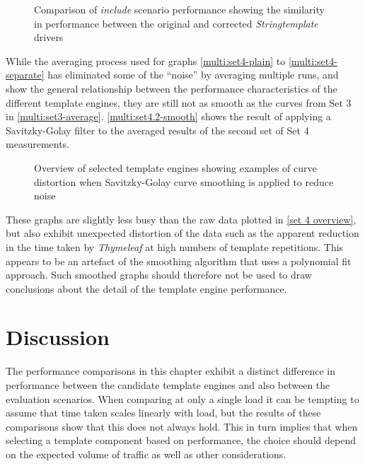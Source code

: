 \begin{figure}[!p]
\centering

\caption{\label{multi:set4stringtemplatye comparison}Comparison of \emph{include} scenario performance showing the similarity in performance between the original and corrected \emph{Stringtemplate} drivers}
\end{figure}

While the averaging process used for graphs \autoref{multi:set4-plain} to \autoref{multi:set4-separate} has eliminated some of the \enquote{noise} by averaging multiple runs, and show the general relationship between the performance characteristics of the different \gls{template engine}s, they are still not as smooth as the curves from Set 3 in \autoref{multi:set3-average}. \autoref{multi:set4.2-smooth} shows the result of applying a Savitzky-Golay filter \citep{Schafer2011} to the averaged results of the second set of Set 4 measurements.

\begin{figure}[!p]
\centering

\caption{\label{multi:set4.2-smooth}Overview of selected template engines showing examples of curve distortion when Savitzky-Golay curve smoothing is applied to reduce noise}
\end{figure}

These graphs are slightly less busy than the raw data plotted in \autoref{set 4 overview}, but also exhibit unexpected distortion of the data such as the apparent reduction in the time taken by \emph{Thymeleaf} at high numbers of template repetitions. This appears to be an artefact of the smoothing algorithm that uses a polynomial fit approach. Such smoothed graphs should therefore not be used to draw conclusions about the detail of the \gls{template engine} performance.

\section{Discussion}
\label{comp:fs2:dicsussion}

The performance comparisons in this chapter exhibit a distinct difference in performance between the candidate \gls{template engine}s and also between the evaluation scenarios. When comparing at only a single load it can be tempting to assume that time taken scales linearly with load, but the results of these comparisons show that this does not always hold. This in turn implies that when selecting a template component based on performance, the choice should depend on the expected volume of traffic as well as other considerations.

